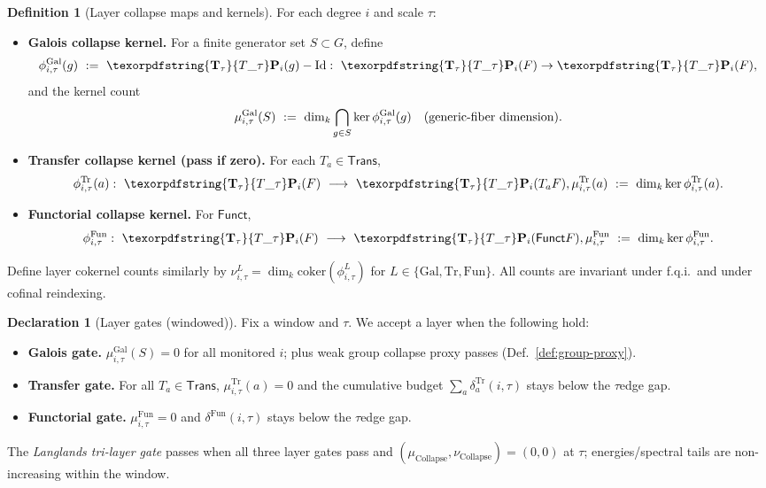 \documentclass[11pt]{article}
\numberwithin{equation}{section}
\theoremstyle{plain}
\theoremstyle{definition}
\theoremstyle{remark}
\DeclareRobustCommand{\hyp}{\nobreakdash-}
\theoremstyle{plain}
\theoremstyle{definition}
\numberwithin{equation}{section}
\theoremstyle{definition}
\newtheorem{definition}[theorem]{Definition}
\newtheorem{declaration}[theorem]{Declaration}
\DeclareRobustCommand{\Ttau}{\texorpdfstring{\ensuremath{\mathbf{T}_{\tau}}}{T\_\tau}}
\numberwithin{equation}{section}
\theoremstyle{plain}
\theoremstyle{definition}
\theoremstyle{remark}
\newcommand{\Trans}{\mathsf{Trans}}
\newcommand{\Funct}{\mathsf{Funct}}
\providecommand{\Tfun}[1]{\mathbf{T}_{#1}}
\providecommand{\Ttau}{\Tfun{\tau}}
\providecommand{\n}{\unskip\space}
\begin{document}
\begin{definition}[Layer collapse maps and kernels]\label{def:layer-kernels}
For each degree \(i\) and scale \(\tau\):
\begin{itemize}
  \item \textbf{Galois collapse kernel.} For a finite generator set \(S\subset G\), define
  \[
  \phi^{\mathrm{Gal}}_{i,\tau}(g)\ :=\ \Ttau\mathbf{P}_i(g)-\mathrm{Id}:\ \Ttau\mathbf{P}_i(F)\to \Ttau\mathbf{P}_i(F),
  \]
  and the kernel count
  \[
  \mu^{\mathrm{Gal}}_{i,\tau}(S)\ :=\ \dim_k\bigcap_{g\in S}\ker\phi^{\mathrm{Gal}}_{i,\tau}(g)\quad\text{(generic\hyp fiber dimension)}.
  \]
  \item \textbf{Transfer collapse kernel (pass if zero).} For each \(T_a\in\Trans\),
  \[
  \phi^{\mathrm{Tr}}_{i,\tau}(a):\ \Ttau\mathbf{P}_i(F)\ \longrightarrow\ \Ttau\mathbf{P}_i(T_a F),\qquad\n  \mu^{\mathrm{Tr}}_{i,\tau}(a)\ :=\ \dim_k\ker\phi^{\mathrm{Tr}}_{i,\tau}(a).
  \]
  \item \textbf{Functorial collapse kernel.} For \(\Funct\),
  \[
  \phi^{\mathrm{Fun}}_{i,\tau}:\ \Ttau\mathbf{P}_i(F)\ \longrightarrow\ \Ttau\mathbf{P}_i(\Funct F),\qquad\n  \mu^{\mathrm{Fun}}_{i,\tau}\ :=\ \dim_k\ker\phi^{\mathrm{Fun}}_{i,\tau}.
  \]
\end{itemize}
Define layer cokernel counts similarly by \(\nu^{L}_{i,\tau}=\dim_k\mathrm{coker}(\phi^L_{i,\tau})\) for \(L\in\{\mathrm{Gal},\mathrm{Tr},\mathrm{Fun}\}\).
All counts are invariant under f.q.i.\ and under cofinal reindexing.
\end{definition}

\begin{declaration}[Layer gates (windowed)]\label{gate:tri-layer}
Fix a window and \(\tau\). We accept a layer when the following hold:
\begin{itemize}
  \item \textbf{Galois gate.} \(\mu^{\mathrm{Gal}}_{i,\tau}(S)=0\) for all monitored \(i\); plus weak group collapse proxy passes (Def.~\ref{def:group-proxy}).
  \item \textbf{Transfer gate.} For all \(T_a\in\Trans\), \(\mu^{\mathrm{Tr}}_{i,\tau}(a)=0\) and the cumulative budget \(\sum_a \delta^{\mathrm{Tr}}_a(i,\tau)\) stays below the \(\tau\)\nobreakdash edge gap.
  \item \textbf{Functorial gate.} \(\mu^{\mathrm{Fun}}_{i,\tau}=0\) and \(\delta^{\mathrm{Fun}}(i,\tau)\) stays below the \(\tau\)\nobreakdash edge gap.
\end{itemize}
The \emph{Langlands tri\hyp layer gate} passes when all three layer gates pass and \((\mu_{\mathrm{Collapse}},\nu_{\mathrm{Collapse}})=(0,0)\) at \(\tau\); energies/spectral tails are non\hyp increasing within the window.
\end{declaration}
\end{document}
